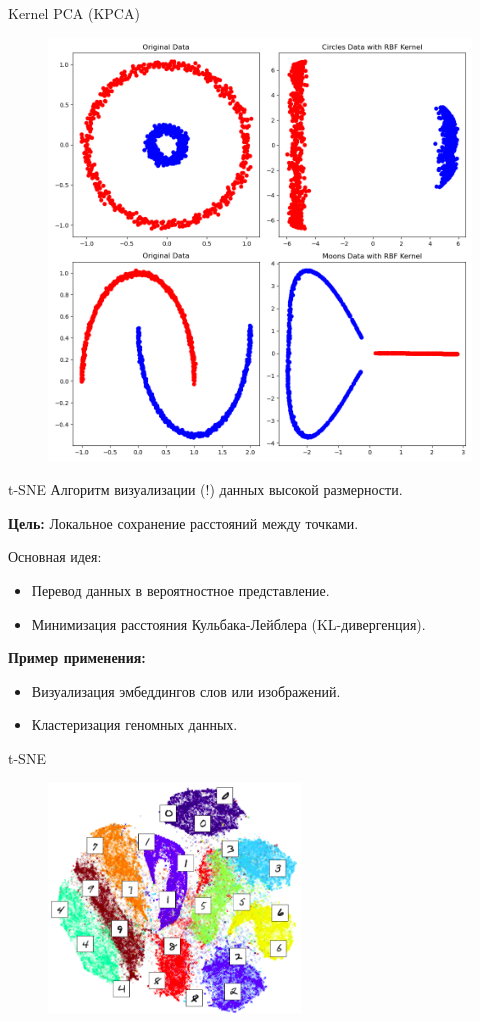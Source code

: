 \begin{frame}{Kernel PCA (KPCA)}
    \begin{figure}
        \centering
        \includegraphics[width=.5\textwidth]{../resources/methods/kpca.png}
    \end{figure}
\end{frame}

\begin{frame}{t-SNE}
    Алгоритм визуализации (!) данных высокой размерности.

    \textbf{Цель:} Локальное сохранение расстояний между точками.

    Основная идея:
    \begin{itemize}
        \item Перевод данных в вероятностное представление.
        \item Минимизация расстояния Кульбака-Лейблера (KL-дивергенция).
    \end{itemize}

    \textbf{Пример применения:}
    \begin{itemize}
        \item Визуализация эмбеддингов слов или изображений.
        \item Кластеризация геномных данных.
    \end{itemize}
\end{frame}

\begin{frame}{t-SNE}
    \begin{figure}
        \centering
        \includegraphics[width=0.6\textwidth]{../resources/methods/tsne.png}
    \end{figure}
\end{frame}

